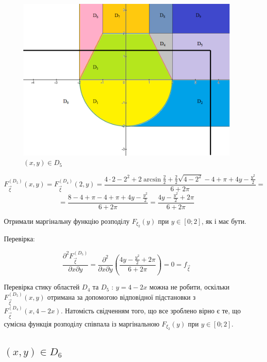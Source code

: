 \documentclass[14pt, a4paper, ukrainian]{extreport}
\begin{document}
	\begin{figure}[H]
		\centering
		\includegraphics[width=\textwidth]{./Image/Im_16_D_5.png}
		\caption{$(x, y) \in D_5$}
		\label{im:D_5}
	\end{figure}
	
	$$ F_{\vec \xi}^{\left(D_5\right)}(x, y) = F_{\vec \xi}^{\left(D_4\right)}(2, y) = \frac{4\cdot2 - 2^2 + 2\arcsin\frac{2}{2} + \frac{2}{2}\sqrt{4-2^2} - 4 + \pi + 4y - \frac{y^2}{2}}{6+2\pi} = 
	$$
	$$ = \frac{8 - 4 + \pi - 4 + \pi + 4y - \frac{y^2}{2}}{6+2\pi} = \frac{4y - \frac{y^2}{2} + 2\pi }{6 + 2\pi}
	$$
	
	Отримали маргінальну функцію розподілу $ F_{\xi_2} (y) $ при $y \in [0; 2]$, як і має бути.
	
	Перевірка:
	
	$$\frac{\partial^2F_{\vec\xi}^{\left(D_5\right)}}{\partial x \partial y} = \frac{\partial^2}{\partial x \partial y}\left(\frac{4y - \frac{y^2}{2} + 2\pi }{6 + 2\pi}\right) = 0 = f_{\vec\xi}
	$$
	
	Перевірка стику областей $D_4$ та $D_5$ : $ y = 4 - 2x$ можна не робити, оскільки $F_{\vec \xi}^{\left(D_5\right)}(x, y)$ отримана за допомогою відповідної підстановки з \\
	$F_{\vec \xi}^{\left(D_4\right)}(x, 4 - 2x)$. Натомість свідченням того, що все зроблено вірно є те, що сумісна функція розподілу співпала із маргінальною $ F_{\xi_2} (y) $ при $y \in [0; 2]$.
	
	\subsection{$(x, y) \in D_6$}
	
\end{document}
